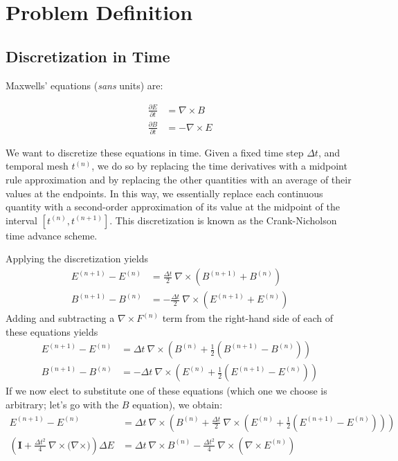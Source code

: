 \documentclass{article}
\newcommand{\dd}[2]{\frac{\partial #1}{\partial #2}}
\newcommand{\Fnijk}[5]{{#1}^{(#2)}_{{#3}{#4}{#5}}}
\newcommand{\Fn}[2]{\Fnijk{#1}{#2}{{}}{{}}{{}}}
\newcommand{\curl}[1]{\nabla \times {#1}}
\newcommand{\Enpo}{\Fn{E}{n+1}}
\newcommand{\Bnpo}{\Fn{B}{n+1}}
\newcommand{\En}{\Fn{E}{n}}
\newcommand{\Bn}{\Fn{B}{n}}
\newcommand{\dt}{\Delta t}
\newcommand{\iden}{\mathbf{I}}
\begin{document}
\section{Problem Definition} 

\subsection{Discretization in Time}
Maxwells' equations ({\it sans} units) are:

\begin{align*}
  \dd{E}{t} &= \curl{B} \\
  \dd{B}{t} &= - \curl{E}
\end{align*}

We want to discretize these equations in time.
Given a fixed time step $\Delta t$, and temporal mesh $\Fn{t}{n}$, we do so by replacing
the time derivatives with a midpoint rule approximation and by replacing
the other quantities with an average of their values at the
endpoints.
In this way, we essentially replace each continuous
quantity with a second-order approximation of its value at the
midpoint of the interval $[\Fn{t}{n}, \Fn{t}{n+1}]$.
This discretization is known as the Crank-Nicholson time advance scheme.

Applying the discretization yields
\begin{align*}
  \Enpo - \En &= \frac{\dt}{2} ~\curl{ ( \Bnpo + \Bn ) } \\
  \Bnpo - \Bn &= - \frac{\dt}{2} ~\curl{ ( \Enpo + \En ) }
\end{align*}
Adding and subtracting a $\curl{\Fn{F}{n}}$ term from the right-hand side of
each of these equations yields
\begin{align*}
  \Enpo - \En &=  \dt ~\curl{\left( \Bn + \frac{1}{2} (\Bnpo -
      \Bn) \right)} \\
  \Bnpo - \Bn &= - \dt ~\curl{\left( \En + \frac{1}{2} (\Enpo -
      \En) \right)}
\end{align*}
If we now elect to substitute one of these equations (which one we
choose is arbitrary; let's go with the $B$ equation), we obtain:
\begin{align*}
  \Enpo - \En &= \dt ~\curl{\left( \Bn + \frac{\dt}{2}~\curl{\left( \En + \frac{1}{2} (\Enpo -
        \En) \right)} \right)} \\
\left(\iden + \frac{\dt^2}{4} ~\curl{(\curl)} \right) \Delta E &= \dt ~\curl{\Bn} -
\frac{\dt^2}{4} ~\curl{(\curl{\En})}
\end{align*}
\end{document}
